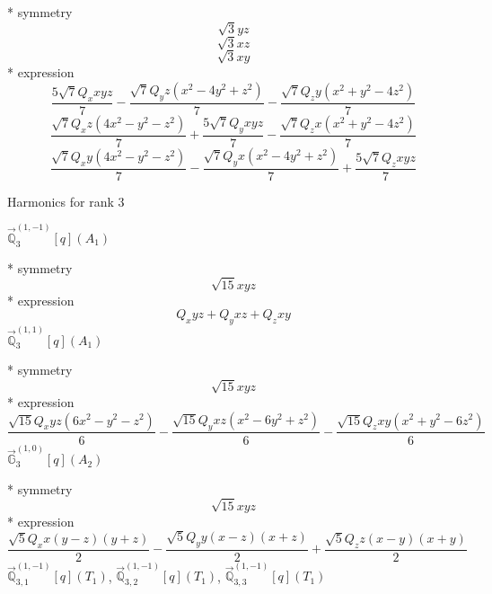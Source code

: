\documentclass[fleqn,8pt]{jsarticle}
\begin{document}
\noindent\quad ** symmetry
\begin{dmath*}
\sqrt{3} y z
\end{dmath*}
\begin{dmath*}
\sqrt{3} x z
\end{dmath*}
\begin{dmath*}
\sqrt{3} x y
\end{dmath*}
\noindent\quad ** expression
\begin{dmath*}
\frac{5 \sqrt{7} Q_{x} x y z}{7} - \frac{\sqrt{7} Q_{y} z \left(x^{2} - 4 y^{2} + z^{2}\right)}{7} - \frac{\sqrt{7} Q_{z} y \left(x^{2} + y^{2} - 4 z^{2}\right)}{7}
\end{dmath*}
\begin{dmath*}
\frac{\sqrt{7} Q_{x} z \left(4 x^{2} - y^{2} - z^{2}\right)}{7} + \frac{5 \sqrt{7} Q_{y} x y z}{7} - \frac{\sqrt{7} Q_{z} x \left(x^{2} + y^{2} - 4 z^{2}\right)}{7}
\end{dmath*}
\begin{dmath*}
\frac{\sqrt{7} Q_{x} y \left(4 x^{2} - y^{2} - z^{2}\right)}{7} - \frac{\sqrt{7} Q_{y} x \left(x^{2} - 4 y^{2} + z^{2}\right)}{7} + \frac{5 \sqrt{7} Q_{z} x y z}{7}
\end{dmath*}

\noindent * Harmonics for rank 3

\noindent\quad $\vec{\mathbb{Q}}_{3}^{(1,-1)}[q](A_{1})$

\noindent\quad ** symmetry
\begin{dmath*}
\sqrt{15} x y z
\end{dmath*}
\noindent\quad ** expression
\begin{dmath*}
Q_{x} y z + Q_{y} x z + Q_{z} x y
\end{dmath*}
\noindent\quad $\vec{\mathbb{Q}}_{3}^{(1,1)}[q](A_{1})$

\noindent\quad ** symmetry
\begin{dmath*}
\sqrt{15} x y z
\end{dmath*}
\noindent\quad ** expression
\begin{dmath*}
\frac{\sqrt{15} Q_{x} y z \left(6 x^{2} - y^{2} - z^{2}\right)}{6} - \frac{\sqrt{15} Q_{y} x z \left(x^{2} - 6 y^{2} + z^{2}\right)}{6} - \frac{\sqrt{15} Q_{z} x y \left(x^{2} + y^{2} - 6 z^{2}\right)}{6}
\end{dmath*}
\noindent\quad $\vec{\mathbb{G}}_{3}^{(1,0)}[q](A_{2})$

\noindent\quad ** symmetry
\begin{dmath*}
\sqrt{15} x y z
\end{dmath*}
\noindent\quad ** expression
\begin{dmath*}
\frac{\sqrt{5} Q_{x} x \left(y - z\right) \left(y + z\right)}{2} - \frac{\sqrt{5} Q_{y} y \left(x - z\right) \left(x + z\right)}{2} + \frac{\sqrt{5} Q_{z} z \left(x - y\right) \left(x + y\right)}{2}
\end{dmath*}
\noindent\quad $\vec{\mathbb{Q}}_{3,1}^{(1,-1)}[q](T_{1})$, $\vec{\mathbb{Q}}_{3,2}^{(1,-1)}[q](T_{1})$, $\vec{\mathbb{Q}}_{3,3}^{(1,-1)}[q](T_{1})$
\end{document}
